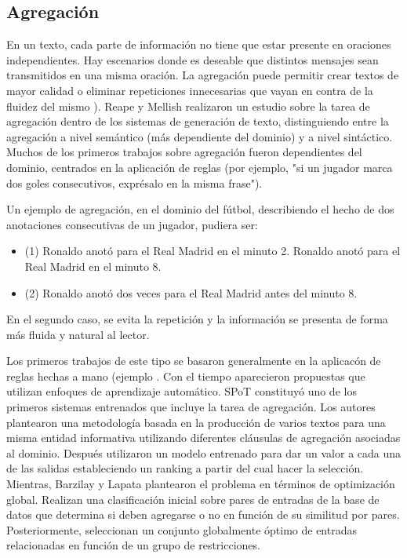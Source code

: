 \subsection{Agregación}\label{subsection:agregacion}

    En un texto, cada parte de información no tiene que estar presente en oraciones independientes. Hay escenarios donde es 
deseable que distintos mensajes sean transmitidos en una misma oraci\'on. La agregaci\'on puede permitir crear textos de mayor 
calidad o eliminar repeticiones innecesarias que vayan en contra de la fluidez del mismo ). Reape y Mellish 
realizaron un estudio sobre la tarea de agregación dentro de los sistemas de generación de texto, distinguiendo entre la agregación a nivel semántico (más dependiente del dominio)
y a nivel sintáctico. Muchos de los primeros trabajos sobre agregación fueron dependientes del dominio, centrados en la aplicación de reglas 
(por ejemplo, "si un jugador marca dos goles consecutivos, expr\'esalo en la misma frase"). 

    Un ejemplo de agregaci\'on, en el dominio del f\'utbol, describiendo el hecho de dos anotaciones consecutivas de un jugador, pudiera ser:

\begin{itemize}
    \item (1) Ronaldo anot\'o para el Real Madrid en el minuto 2. Ronaldo anot\'o para el Real Madrid en el minuto 8.
    \item (2) Ronaldo anot\'o dos veces para el Real Madrid antes del minuto 8.
\end{itemize}

    En el segundo caso, se evita la repetici\'on y la información se presenta de forma m\'as fluida y natural al lector.
    
Los primeros trabajos de este tipo se basaron generalmente en la aplicacón de reglas hechas a mano (ejemplo . Con el tiempo aparecieron propuestas que 
utilizan enfoques de aprendizaje autom\'atico. SPoT  constituyó uno de los primeros sistemas entrenados que incluye la tarea de agregación. 
Los autores plantearon una metodolog\'ia basada en la producci\'on de varios textos para una misma entidad informativa utilizando diferentes cl\'ausulas de agregación asociadas al dominio. Despu\'es utilizaron un modelo 
entrenado para dar un valor a cada una de las salidas estableciendo un ranking a partir del cual hacer la selección. Mientras, Barzilay y Lapata 
plantearon el problema en términos de optimización global. Realizan una clasificación inicial sobre pares de entradas de la base de datos que determina 
si deben agregarse o no en función de su similitud por pares. Posteriormente, seleccionan un conjunto globalmente óptimo de entradas relacionadas en función
de un grupo de restricciones.

